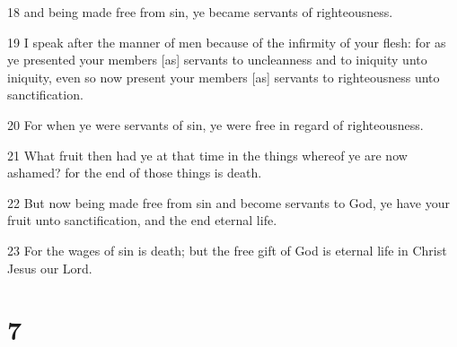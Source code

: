 \par 18 and being made free from sin, ye became servants of righteousness.
\par 19 I speak after the manner of men because of the infirmity of your flesh: for as ye presented your members [as] servants to uncleanness and to iniquity unto iniquity, even so now present your members [as] servants to righteousness unto sanctification.
\par 20 For when ye were servants of sin, ye were free in regard of righteousness.
\par 21 What fruit then had ye at that time in the things whereof ye are now ashamed? for the end of those things is death.
\par 22 But now being made free from sin and become servants to God, ye have your fruit unto sanctification, and the end eternal life.
\par 23 For the wages of sin is death; but the free gift of God is eternal life in Christ Jesus our Lord.

\chapter{7}

